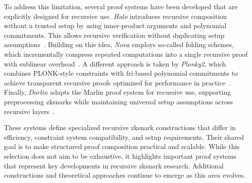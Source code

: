 To address this limitation, several proof systems have been developed that are explicitly designed for recursive use. \emph{Halo} introduces recursive composition without a trusted setup by using inner-product arguments and polynomial commitments. This allows recursive verification without duplicating setup assumptions~\cite{cryptoeprint:2019/1021}. Building on this idea, \emph{Nova} employs so-called folding schemes, which incrementally compress repeated computations into a single recursive proof with sublinear overhead~\cite{cryptoeprint:2021/370}. A different approach is taken by \emph{Plonky2}, which combines PLONK-style constraints with \acrfull{fri}-based polynomial commitments to achieve transparent recursive proofs optimized for performance in practice~\cite{Plonky2Draft2022}. Finally, \emph{Darlin} adapts the Marlin proof system for recursive use, supporting preprocessing \acrshort{zksnark}s while maintaining universal setup assumptions across recursive layers~\cite{haböck2021darlinrecursiveproofsusing}.

These systems define specialized recursive \acrshort{zksnark} constructions that differ in efficiency, constraint system compatibility, and setup requirements. Their shared goal is to make structured proof composition practical and scalable. While this selection does not aim to be exhaustive, it highlights important proof systems that represent key developments in recursive \acrshort{zksnark} research. Additional constructions and theoretical approaches continue to emerge as this area evolves.
